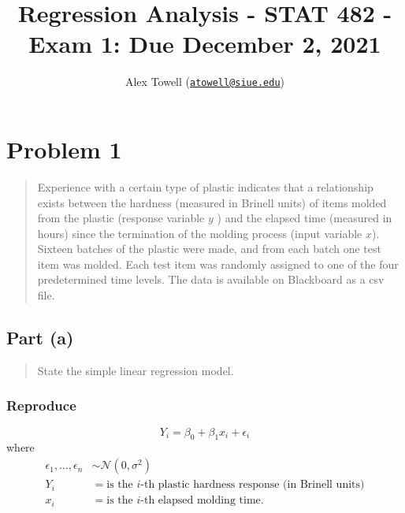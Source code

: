 \documentclass[
]{article}
\title{Regression Analysis - STAT 482 - Exam 1: Due December 2, 2021}
\author{Alex Towell
(\href{mailto:atowell@siue.edu}{\nolinkurl{atowell@siue.edu}})}
\date{}
\begin{document}
\maketitle

\newcommand{\sos}[1]{\mathrm{SS_{#1}}}
\newcommand{\ms}[1]{\mathrm{MS_{#1}}}
\newcommand{\sd}{\operatorname{sd}}
\newcommand{\var}{\operatorname{var}}
\newcommand{\expect}{\operatorname{E}}
\newcommand{\corr}{\operatorname{cor}}
\newcommand{\cov}{\operatorname{cov}}
\newcommand{\se}{\operatorname{se}}
\newcommand{\eval}[2]{\left. #1 \right\vert_{#2}}
\newcommand{\degf}[1]{\mathrm{df_{#1}}}
\newcommand{\entropy}{\operatorname{H}}
\newcommand{\param}[1]{\textcolor{blue}{\texttt{#1}}}
\newcommand{\ci}{\operatorname{CI}}

\hypertarget{problem-1}{%
\section{Problem 1}\label{problem-1}}

\begin{quote}
Experience with a certain type of plastic indicates that a relationship
exists between the hardness (measured in Brinell units) of items molded
from the plastic (response variable \(y\) ) and the elapsed time
(measured in hours) since the termination of the molding process (input
variable \(x\)). Sixteen batches of the plastic were made, and from each
batch one test item was molded. Each test item was randomly assigned to
one of the four predetermined time levels. The data is available on
Blackboard as a csv file.
\end{quote}

\hypertarget{part-a}{%
\subsection{Part (a)}\label{part-a}}

\begin{quote}
State the simple linear regression model.
\end{quote}

\hypertarget{reproduce}{%
\subsubsection{Reproduce}\label{reproduce}}

\[
  Y_i = \beta_0 + \beta_1 x_i + \epsilon_i
\] where \begin{align*}
  \epsilon_1,\ldots,\epsilon_n &\sim \mathcal{N}(0,\sigma^2)\\
  Y_i &= \text{is the $i$-th plastic hardness response (in Brinell units)}\\
  x_i &= \text{is the $i$-th elapsed molding time}.
\end{align*}
\end{document}
